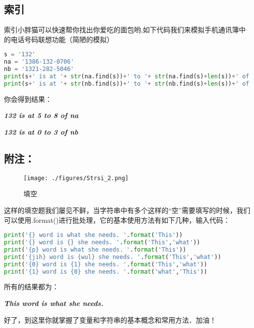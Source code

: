 \subsection{索引}
索引小胖猫可以快速帮你找出你爱吃的面包哟,如下代码我们来模拟手机通讯簿中的电话号码联想功能（简陋的模拟）

\begin{lstlisting}[language=python]
s = '132'
na = '1386-132-0706'
nb = '1321-282-5046'
print(s+' is at '+ str(na.find(s))+' to '+ str(na.find(s)+len(s))+' of na')
print(s+' is at '+ str(nb.find(s))+' to '+ str(nb.find(s)+len(s))+' of nb')
\end{lstlisting}
你会得到结果：

\textsl{\textbf{132 is at 5 to 8 of na}}

\textsl{\textbf{132 is at 0 to 3 of nb}}
\subsection{附注：}
\begin{figure}[ht]
\centering
\texttt{[image: ./figures/Strsi\_2.png]}
\caption{填空} \label{Strsi_fig2}
\end{figure}
这样的填空题我们屡见不鲜，当字符串中有多个这样的“空”需要填写的时候，我们可以使用.format()进行批处理，它的基本使用方法有如下几种，输入代码：
\begin{lstlisting}[language=python]
print('{} word is what she needs. '.format('This'))
print('{} word is {} she needs. '.format('This','what'))
print('{p} word is what she needs. '.format('This'))
print('{jih} word is {wul} she needs. '.format('This','what'))
print('{0} word is {1} she needs. '.format('This','what'))
print('{1} word is {0} she needs. '.format('what','This'))
\end{lstlisting}
所有的结果都为：

\textsl{\textbf{This word is what she needs.}}

好了，到这里你就掌握了变量和字符串的基本概念和常用方法．加油！